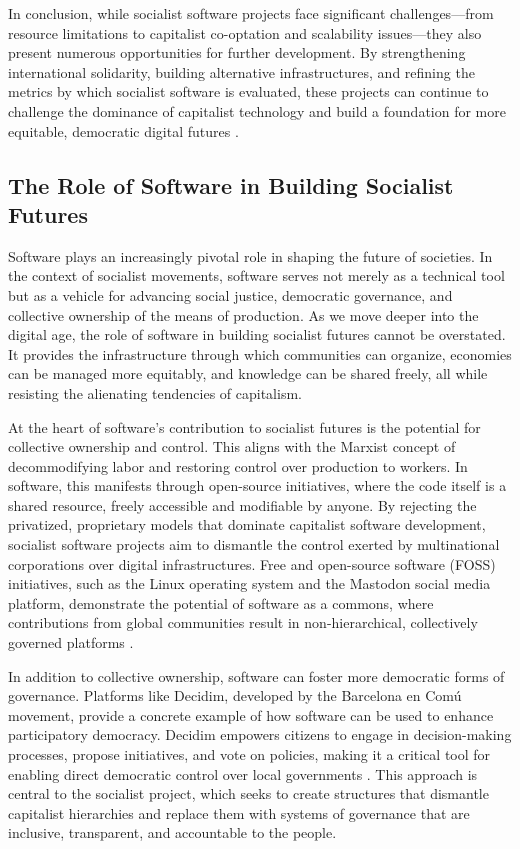\begin{refsection}
In conclusion, while socialist software projects face significant challenges—from resource limitations to capitalist co-optation and scalability issues—they also present numerous opportunities for further development. By strengthening international solidarity, building alternative infrastructures, and refining the metrics by which socialist software is evaluated, these projects can continue to challenge the dominance of capitalist technology and build a foundation for more equitable, democratic digital futures \cite[pp.~125-126]{barandiaran2024}.

\subsection{The Role of Software in Building Socialist Futures}

Software plays an increasingly pivotal role in shaping the future of societies. In the context of socialist movements, software serves not merely as a technical tool but as a vehicle for advancing social justice, democratic governance, and collective ownership of the means of production. As we move deeper into the digital age, the role of software in building socialist futures cannot be overstated. It provides the infrastructure through which communities can organize, economies can be managed more equitably, and knowledge can be shared freely, all while resisting the alienating tendencies of capitalism.

At the heart of software’s contribution to socialist futures is the potential for collective ownership and control. This aligns with the Marxist concept of decommodifying labor and restoring control over production to workers. In software, this manifests through open-source initiatives, where the code itself is a shared resource, freely accessible and modifiable by anyone. By rejecting the privatized, proprietary models that dominate capitalist software development, socialist software projects aim to dismantle the control exerted by multinational corporations over digital infrastructures. Free and open-source software (FOSS) initiatives, such as the Linux operating system and the Mastodon social media platform, demonstrate the potential of software as a commons, where contributions from global communities result in non-hierarchical, collectively governed platforms \cite[pp.~124-126]{moody2002}.

In addition to collective ownership, software can foster more democratic forms of governance. Platforms like Decidim, developed by the Barcelona en Comú movement, provide a concrete example of how software can be used to enhance participatory democracy. Decidim empowers citizens to engage in decision-making processes, propose initiatives, and vote on policies, making it a critical tool for enabling direct democratic control over local governments \cite[pp.~29-30]{barandiaran2024}. This approach is central to the socialist project, which seeks to create structures that dismantle capitalist hierarchies and replace them with systems of governance that are inclusive, transparent, and accountable to the people.


\end{refsection}
